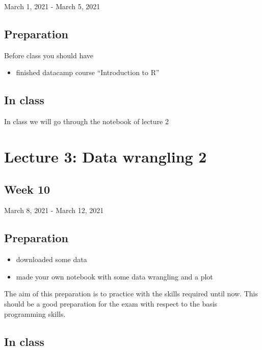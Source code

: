 \documentclass[
]{book}
\providecommand{\tightlist}{%
  \setlength{\itemsep}{0pt}\setlength{\parskip}{0pt}}
\begin{document}
March 1, 2021 - March 5, 2021

\hypertarget{preparation-1}{%
\subsection{Preparation}\label{preparation-1}}

Before class you should have

\begin{itemize}
\tightlist
\item
  finished datacamp course ``Introduction to R''
\end{itemize}

\hypertarget{in-class-1}{%
\subsection{In class}\label{in-class-1}}

In class we will go through the notebook of lecture 2

\hypertarget{lecture-3-data-wrangling-2}{%
\section{Lecture 3: Data wrangling 2}\label{lecture-3-data-wrangling-2}}

\hypertarget{week-10}{%
\subsection{Week 10}\label{week-10}}

March 8, 2021 - March 12, 2021

\hypertarget{preparation-2}{%
\subsection{Preparation}\label{preparation-2}}

\begin{itemize}
\tightlist
\item
  downloaded some data
\item
  made your own notebook with some data wrangling and a plot
\end{itemize}

The aim of this preparation is to practice with the skills required until now. This should be a good preparation for the exam with respect to the basis programming skills.

\hypertarget{in-class-2}{%
\subsection{In class}\label{in-class-2}}
\end{document}
